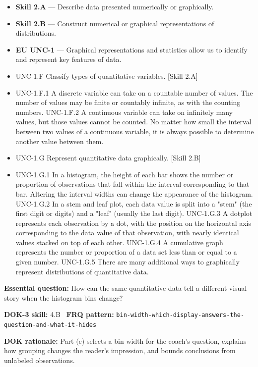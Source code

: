 \documentclass[11pt]{article}
\begin{document}


{\small
\begin{itemize}[leftmargin=1.5em,itemsep=2pt,topsep=2pt]
  \item \textbf{Skill 2.A} --- Describe data presented numerically or graphically.
  \item \textbf{Skill 2.B} --- Construct numerical or graphical representations of distributions.
  \item \textbf{EU UNC-1} --- Graphical representations and statistics allow us to identify and represent key features of data.
  \item UNC-1.F Classify types of quantitative variables. [Skill 2.A]
  \item UNC-1.F.1 A discrete variable can take on a countable number of values. The number of values may be finite or countably infinite, as with the counting numbers.  UNC-1.F.2 A continuous variable can take on infinitely many values, but those values cannot be counted. No matter how small the interval between two values of a continuous variable, it is always possible to determine another value between them.
  \item UNC-1.G Represent quantitative data graphically. [Skill 2.B]
  \item UNC-1.G.1 In a histogram, the height of each bar shows the number or proportion of observations that fall within the interval corresponding to that bar. Altering the interval widths can change the appearance of the histogram.  UNC-1.G.2 In a stem and leaf plot, each data value is split into a "stem" (the first digit or digits) and a "leaf" (usually the last digit).  UNC-1.G.3 A dotplot represents each observation by a dot, with the position on the horizontal axis corresponding to the data value of that observation, with nearly identical values stacked on top of each other.  UNC-1.G.4 A cumulative graph represents the number or proportion of a data set less than or equal to a given number.  UNC-1.G.5 There are many additional ways to graphically represent distributions of quantitative data.
\end{itemize}
}
\textbf{Essential question:} How can the same quantitative data tell a different visual story when the histogram bins change?\par
\textbf{DOK-3 skill:} 4.B \textperiodcentered\ \textbf{FRQ pattern:} {\small\texttt{bin-\allowbreak{}width-\allowbreak{}which-\allowbreak{}display-\allowbreak{}answers-\allowbreak{}the-\allowbreak{}question-\allowbreak{}and-\allowbreak{}what-\allowbreak{}it-\allowbreak{}hides}}\par
\textbf{DOK rationale:} Part (c) selects a bin width for the coach's question, explains how grouping changes the reader's impression, and bounds conclusions from unlabeled observations.\par
\end{document}
